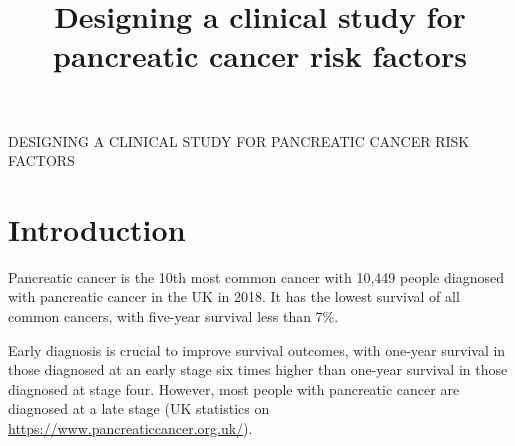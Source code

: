 \documentclass[a4paper,11pt]{scrartcl}
\title{Designing a clinical study for pancreatic cancer risk factors}
\date{}
\newcommand{\ignore}[1]{}
\theoremstyle{plain}
\theoremstyle{remark}
\theoremstyle{definition}
\begin{document}
\begin{center}
\doublespacing
{\LARGE DESIGNING A CLINICAL STUDY FOR PANCREATIC CANCER RISK FACTORS}
\end{center}



\section{Introduction}
\label{sec:introduction}
\ignore{
The purpose of this activity is to give students the opportunity to think about the issues involved in designing case-control and cohort studies (future development: think about adding a cross-sectional study and a randomised control trial). The activity is designed to be used both for face-to-face teaching and for distant learners, with the due adaptations. A sheet will be handed out with the scenario and the scheme here included, and another, pre-filled with answers will be made available at the end of the activity. 

   
\section{Presentation}

\textit{\textbf{Don't hand out sheets yet. }}

\medskip

With the use of a presentation, recap case-control and cohort studies designs, what is a biobank. Then move to the questions here below. 


\section{Setting the scenario}

\textit{\textbf{Have a summary on the presentation and read out the following. This text will also be on the sheets that students will be handed later. }}
\medskip

}
Pancreatic cancer is the 10th most common cancer with 10,449 people diagnosed with pancreatic cancer in the UK in 2018. It has the lowest survival of all common cancers, with five-year survival less than 7\%. 

\medskip

Early diagnosis is crucial to improve survival outcomes, with one-year survival in those diagnosed at an early stage six times higher than one-year survival in those diagnosed at stage four.  
However, most people with pancreatic cancer are diagnosed at a late stage (UK statistics on \url{https://www.pancreaticcancer.org.uk/}). 
\medskip
\end{document}
